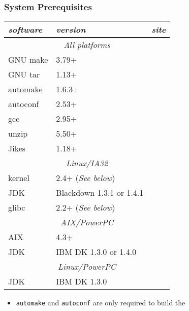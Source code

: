 \subsubsection{System Prerequisites}

\begin{table}[h]
\begin{center}
\begin{tabular}{|l|l|l|} \hline\hline
{\em software} & {\em version} & {\em site} \\ \hline
\multicolumn{3}{|c|}{\em All platforms}                     \\ \hline
GNU make       & 3.79+    & \xlink{\tt \makeURL}{\makeURL}         \\ 
GNU tar        & 1.13+    & \xlink{\tt \tarURL}{\tarURL}           \\ 
automake       & 1.6.3+   & \xlink{\tt \automakeURL}{\automakeURL} \\
autoconf       & 2.53+    & \xlink{\tt \autoconfURL}{\autoconfURL} \\
gcc            & 2.95+    & \xlink{\tt \gccURL}{\gccURL}           \\
unzip          & 5.50+    & \xlink{\tt \unzipURL}{\unzipURL}       \\
Jikes          & 1.18+    & \xlink{\tt \jikesURL}{\jikesURL}       \\
\multicolumn{3}{|c|}{\em Linux/IA32}                      \\ \hline
kernel         & 2.4+ ({\em See below}) & \xlink{\tt \linuxKernelURL}{\linuxKernelURL} \\
JDK            & Blackdown 1.3.1 or 1.4.1 & \xlink{\tt \BlackdownURL}{\BlackdownURL} \\
glibc          & 2.2+ ({\em See below}) & \xlink{\tt \glibcURL}{\glibcURL} \\ \hline
\multicolumn{3}{|c|}{\em AIX/PowerPC}                     \\ \hline
AIX            & 4.3+     &                          \\
JDK            & IBM DK 1.3.0 or 1.4.0 & \xlink{\tt \AIXJdkURL}{\AIXJdkURL} \\ \hline
\multicolumn{3}{|c|}{\em Linux/PowerPC}                      \\ \hline
JDK            & IBM DK 1.3.0    & \xlink{\tt \linuxPPCJDKURL}{\linuxPPCJDKURL} \\
\hline\hline 
\end{tabular}
\begin{itemize}
\item {\tt automake} and {\tt autoconf} are only required to build the

\end{itemize}
\end{center}
\end{table}

